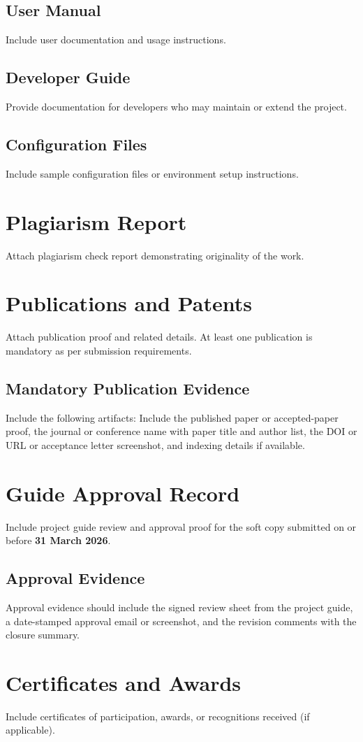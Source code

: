 \section{User Manual}
Include user documentation and usage instructions.

\section{Developer Guide}
Provide documentation for developers who may maintain or extend the project.

\section{Configuration Files}
Include sample configuration files or environment setup instructions.

\chapter{Plagiarism Report}
Attach plagiarism check report demonstrating originality of the work.

\chapter{Publications and Patents}
Attach publication proof and related details. At least one publication is mandatory as per submission requirements.

\section{Mandatory Publication Evidence}
Include the following artifacts:
Include the published paper or accepted-paper proof, the journal or conference name with paper title and author list, the DOI or URL or acceptance letter screenshot, and indexing details if available.

\chapter{Guide Approval Record}
Include project guide review and approval proof for the soft copy submitted on or before \textbf{31 March 2026}.

\section{Approval Evidence}
Approval evidence should include the signed review sheet from the project guide, a date-stamped approval email or screenshot, and the revision comments with the closure summary.

\chapter{Certificates and Awards}
Include certificates of participation, awards, or recognitions received (if applicable).

\clearpage
